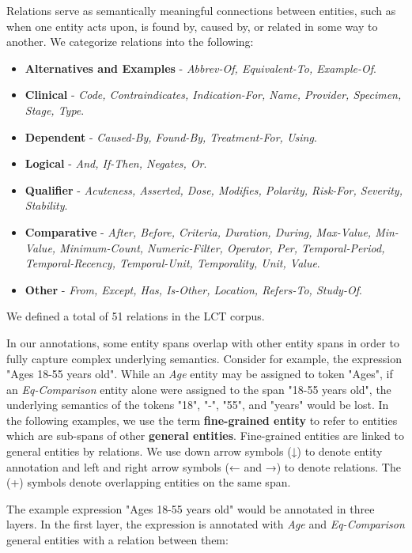 \documentclass[../main.tex]{subfiles}
\begin{document}
Relations serve as semantically meaningful connections between entities, such as when one entity acts upon, is found by, caused by, or related in some way to another. We categorize relations into the following:

\begin{itemize}
    \item \textbf{Alternatives and Examples} - \textit{Abbrev-Of, Equivalent-To, Example-Of}. %
    \item \textbf{Clinical} - \textit{Code, Contraindicates, Indication-For, Name, Provider, Specimen, Stage, Type}. %
    \item \textbf{Dependent} - \textit{Caused-By, Found-By, Treatment-For, Using}. %
    \item \textbf{Logical} - \textit{And, If-Then, Negates, Or}. %
    \item \textbf{Qualifier} - \textit{Acuteness, Asserted, Dose, Modifies, Polarity, Risk-For, Severity, Stability}.
    \item \textbf{Comparative} - \textit{After, Before, Criteria, Duration, During, Max-Value, Min-Value, Minimum-Count, Numeric-Filter, Operator, Per, Temporal-Period, Temporal-Recency, Temporal-Unit, Temporality, Unit, Value}.
    \item \textbf{Other} - \textit{From, Except, Has, Is-Other, Location, Refers-To, Study-Of}.
\end{itemize}

\noindent We defined a total of 51 relations in the LCT corpus.

In our annotations, some entity spans overlap with other entity spans in order to fully capture complex underlying semantics. Consider for example, the expression "Ages 18-55 years old". While an \textit{Age} entity may be assigned to token "Ages", if an \textit{Eq-Comparison} entity alone were assigned to the span "18-55 years old", the underlying semantics of the tokens "18", "-", "55", and "years" would be lost. In the following examples, we use the term \textbf{fine-grained entity} to refer to entities which are sub-spans of other \textbf{general entities}. Fine-grained entities are linked to general entities by relations. We use down arrow symbols (↓) to denote entity annotation and left and right arrow symbols (← and →) to denote relations. The (+) symbols denote overlapping entities on the same span.

The example expression "Ages 18-55 years old" would be annotated in three layers. In the first layer, the expression is annotated with \textit{Age} and \textit{Eq-Comparison} general entities with a relation between them: \\
\end{document}
